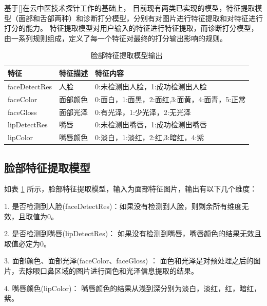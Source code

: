 基于[]在云中医技术探针工作的基础上， 目前现有两类已实现的模型，特征提取模型（面部和舌部两种）和诊断打分模型，分别有对图片进行特征提取和对特征进行打分的能力。
特征提取模型对用户输入的特征进行特征提取，而诊断打分模型，由一系列规则组成，定义了每一个特征对最终的打分输出影响的规则。


\begin{table}[]
    \centering
    \begin{tabular}{lll}
        \toprule
        特征          & 特征描述     & 特征内容 \\ 
        \midrule
        faceDetectRes & 人脸   & 0:未检测出人脸，1:成功检测出人脸  \\
        faceColor     & 面部颜色 & 0:面白，1:面黑，2:面红,3:面黄，4:面青，5:正常 \\
        faceGloss     & 面部光泽 & 0:有光泽，1:少光泽，2:无光泽\\
        lipDetectRes  & 嘴唇   & 0:未检测出嘴唇，1:成功检测出嘴唇\\
        lipColor      & 嘴唇颜色 & 0:淡白，1:淡红，2:红,3:暗红，4:紫   \\
        \bottomrule
    \end{tabular}
    \caption{脸部特征提取模型输出}
    \label{tab:face-feature}
\end{table}

\subsection{脸部特征提取模型}
如表 \ref{tab:face-feature} 所示，脸部特征提取模型，输入为面部特征图片，输出有以下几个维度：

1. 是否检测到人脸(faceDetectRes)：如果没有检测到人脸，则剩余所有维度无效，且取值为0。

2. 是否检测到嘴唇(lipDetectRes)： 如果没有检测到嘴唇，嘴唇颜色的结果无效且取值必定为0。

3. 面部颜色、面部光泽(faceColor、faceGloss) ： 面色和光泽是对预处理之后的图片，去除眼口鼻区域的图片进行面色和光泽信息提取的结果。

4. 嘴唇颜色(lipColor)： 嘴唇颜色的结果从浅到深分别为淡白，淡红，红，暗红，紫。

